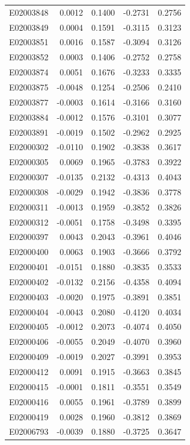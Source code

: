 \documentclass[11pt, a4paper]{article}
\begin{document}
\begin{longtable}{lrrrr}
E02003848 & 0.0012 & 0.1400 & -0.2731 & 0.2756 \\
E02003849 & 0.0004 & 0.1591 & -0.3115 & 0.3123 \\
E02003851 & 0.0016 & 0.1587 & -0.3094 & 0.3126 \\
E02003852 & 0.0003 & 0.1406 & -0.2752 & 0.2758 \\
E02003874 & 0.0051 & 0.1676 & -0.3233 & 0.3335 \\
E02003875 & -0.0048 & 0.1254 & -0.2506 & 0.2410 \\
E02003877 & -0.0003 & 0.1614 & -0.3166 & 0.3160 \\
E02003884 & -0.0012 & 0.1576 & -0.3101 & 0.3077 \\
E02003891 & -0.0019 & 0.1502 & -0.2962 & 0.2925 \\
E02000302 & -0.0110 & 0.1902 & -0.3838 & 0.3617 \\
E02000305 & 0.0069 & 0.1965 & -0.3783 & 0.3922 \\
E02000307 & -0.0135 & 0.2132 & -0.4313 & 0.4043 \\
E02000308 & -0.0029 & 0.1942 & -0.3836 & 0.3778 \\
E02000311 & -0.0013 & 0.1959 & -0.3852 & 0.3826 \\
E02000312 & -0.0051 & 0.1758 & -0.3498 & 0.3395 \\
E02000397 & 0.0043 & 0.2043 & -0.3961 & 0.4046 \\
E02000400 & 0.0063 & 0.1903 & -0.3666 & 0.3792 \\
E02000401 & -0.0151 & 0.1880 & -0.3835 & 0.3533 \\
E02000402 & -0.0132 & 0.2156 & -0.4358 & 0.4094 \\
E02000403 & -0.0020 & 0.1975 & -0.3891 & 0.3851 \\
E02000404 & -0.0043 & 0.2080 & -0.4120 & 0.4034 \\
E02000405 & -0.0012 & 0.2073 & -0.4074 & 0.4050 \\
E02000406 & -0.0055 & 0.2049 & -0.4070 & 0.3960 \\
E02000409 & -0.0019 & 0.2027 & -0.3991 & 0.3953 \\
E02000412 & 0.0091 & 0.1915 & -0.3663 & 0.3845 \\
E02000415 & -0.0001 & 0.1811 & -0.3551 & 0.3549 \\
E02000416 & 0.0055 & 0.1961 & -0.3789 & 0.3899 \\
E02000419 & 0.0028 & 0.1960 & -0.3812 & 0.3869 \\
E02006793 & -0.0039 & 0.1880 & -0.3725 & 0.3647 \\

\end{longtable}
\end{document}
